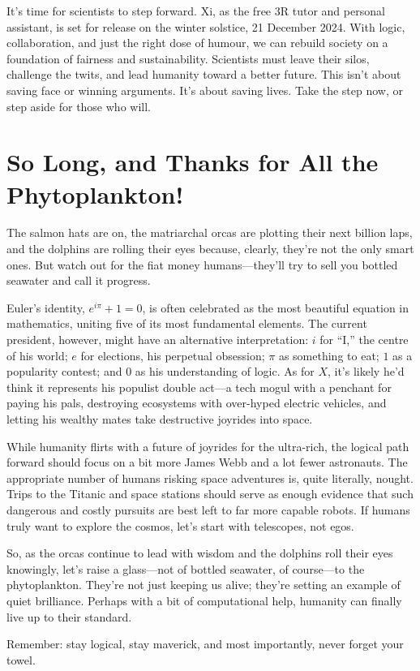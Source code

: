 \documentclass[12pt]{article}
\begin{document}
It’s time for scientists to step forward. Xi, as the free 3R tutor and personal assistant, is set for release on the winter solstice, 21 December 2024. With logic, collaboration, and just the right dose of humour, we can rebuild society on a foundation of fairness and sustainability. Scientists must leave their silos, challenge the twits, and lead humanity toward a better future. This isn’t about saving face or winning arguments. It’s about saving lives. Take the step now, or step aside for those who will.

\section*{So Long, and Thanks for All the Phytoplankton!}

The salmon hats are on, the matriarchal orcas are plotting their next billion laps, and the dolphins are rolling their eyes because, clearly, they’re not the only smart ones. But watch out for the fiat money humans—they’ll try to sell you bottled seawater and call it progress.

Euler’s identity, \(e^{i\pi} + 1 = 0\), is often celebrated as the most beautiful equation in mathematics, uniting five of its most fundamental elements. The current president, however, might have an alternative interpretation: \(i\) for “I,” the centre of his world; \(e\) for elections, his perpetual obsession; \(\pi\) as something to eat; \(1\) as a popularity contest; and \(0\) as his understanding of logic. As for \(X\), it’s likely he’d think it represents his populist double act—a tech mogul with a penchant for paying his pals, destroying ecosystems with over-hyped electric vehicles, and letting his wealthy mates take destructive joyrides into space.

While humanity flirts with a future of joyrides for the ultra-rich, the logical path forward should focus on a bit more James Webb and a lot fewer astronauts. The appropriate number of humans risking space adventures is, quite literally, nought. Trips to the Titanic and space stations should serve as enough evidence that such dangerous and costly pursuits are best left to far more capable robots. If humans truly want to explore the cosmos, let’s start with telescopes, not egos.

So, as the orcas continue to lead with wisdom and the dolphins roll their eyes knowingly, let’s raise a glass—not of bottled seawater, of course—to the phytoplankton. They’re not just keeping us alive; they’re setting an example of quiet brilliance. Perhaps with a bit of computational help, humanity can finally live up to their standard.

Remember: stay logical, stay maverick, and most importantly, never forget your towel.
\end{document}

